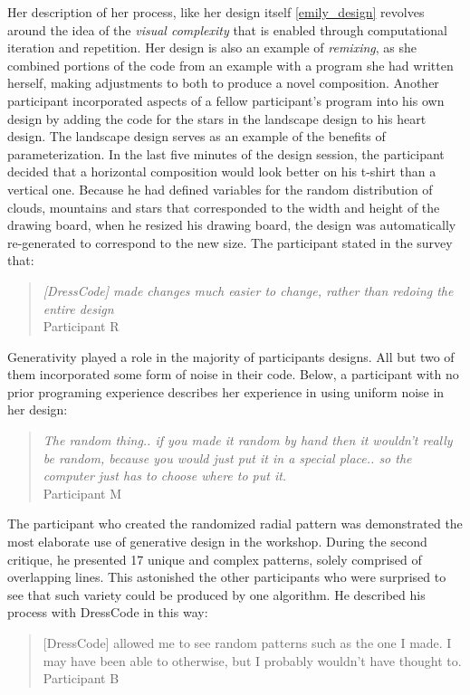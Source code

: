 \documentclass{sigchi}
\begin{document}
Her description of her process, like her design itself \ref{emily_design} revolves around the idea of the \textit{visual complexity} that is enabled through computational iteration and repetition. Her design is also an example of \textit{remixing}, as she combined portions of the code from an example with a program she had written herself, making adjustments to both to produce a novel composition. Another participant incorporated aspects of a fellow participant's program into his own design by adding the code for the stars in the landscape design to his heart design. The landscape design serves as an example of the benefits of parameterization. In the last five minutes of the design session, the participant decided that a horizontal composition would look better on his t-shirt than a vertical one. Because he had defined variables for the random distribution of clouds, mountains and stars that corresponded to the width and height of the drawing board, when he resized his drawing board, the design was automatically re-generated to correspond to the new size. The participant stated in the survey that:
\begin{quotation}
	\textit{[DressCode] made changes much easier to change, rather than redoing the entire design}
	\\Participant R
\end{quotation}
Generativity played a role in the majority of participants designs. All but two of them incorporated some form of noise in their code. Below, a participant with no prior programing experience describes her experience in using uniform noise in her design:
\begin{quotation}
	\textit{The random thing.. if you made it random by hand then it wouldn't really be random, because you would just put it in a special place.. so the computer just has to choose where to put it.}
		\\Participant M
\end{quotation}
The participant who created the randomized radial pattern was demonstrated the most elaborate use of generative design in the workshop. During the second critique, he presented 17 unique and complex patterns, solely comprised of overlapping lines. This astonished the other participants who were surprised to see that such variety could be produced by one algorithm. He described his process with DressCode in this way:
\begin{quotation} [DressCode] allowed me to see random patterns such as the one I made. I may have been able to otherwise, but I probably wouldn't have thought to.
		\\Participant B
	\end{quotation}
\end{document}
